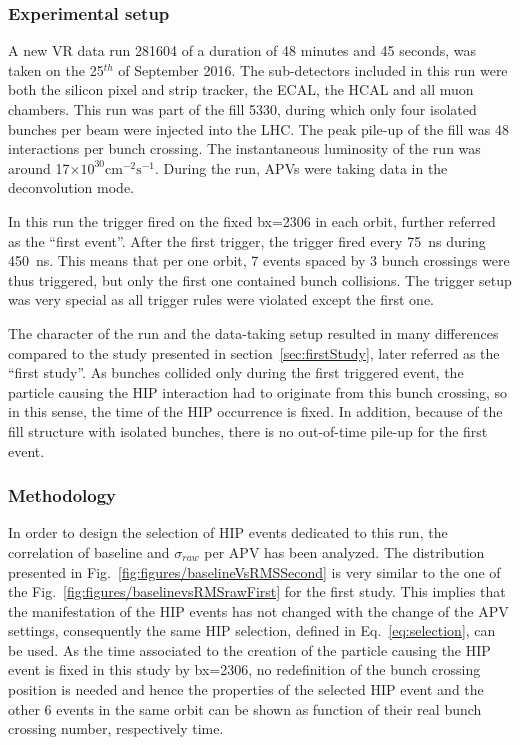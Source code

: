 
\subsubsection{Experimental setup}

A new VR data run 281604 of a duration of 48 minutes and 45 seconds, was taken on the 25$^{th}$ of September 2016. The sub-detectors included in this run were both the silicon pixel and strip tracker, the ECAL, the HCAL and all muon chambers. This run was part of the fill 5330, during which only four isolated bunches per beam were injected into the LHC. The peak pile-up of the fill was 48 interactions per bunch crossing. The instantaneous luminosity of the run was around 17$\times 10^{30} \mathrm{cm^{-2} s^{-1}}$. During the run, APVs were taking data in the deconvolution mode. 

In this run the trigger fired on the fixed bx=2306 in each orbit, further referred as the ``first event''. After the first trigger, the trigger fired every 75~ns during 450~ns. This means that per one orbit, 7 events spaced by 3 bunch crossings were thus triggered, but only the first one contained bunch collisions. The trigger setup was very special as all trigger rules were violated except the first one.


The character of the run and  the data-taking setup resulted in many differences compared to the study presented in section~\ref{sec:firstStudy}, later referred as the ``first study''. As bunches collided only during the first triggered event, the particle causing the HIP interaction had to originate from this bunch crossing, so in this sense, the time of the HIP occurrence is fixed. In addition, because of the fill structure with isolated bunches, there is no out-of-time pile-up for the first event.

\subsubsection{Methodology}

In order to design the selection of HIP events dedicated to this run, the correlation of baseline and $\sigma_{raw}$ per APV has been analyzed. The distribution presented in Fig.~\ref{fig:figures/baselineVsRMSSecond} is very similar to the one of the Fig.~\ref{fig:figures/baselinevsRMSrawFirst} for the first study. This implies that the manifestation of the HIP events has not changed with the change of the APV settings, consequently the same HIP selection, defined in Eq.~\ref{eq:selection}, can be used. As the time associated to the creation of the particle causing the HIP event is fixed in this study by bx=2306, no redefinition of the bunch crossing position is needed and hence the properties of the selected HIP event and the other 6 events in the same orbit can be shown as function of their real bunch crossing number, respectively time.

